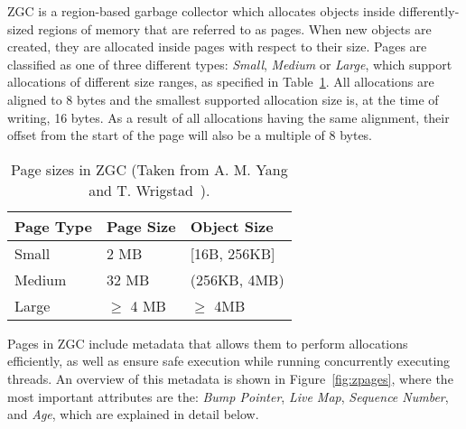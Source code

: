 
ZGC is a region-based garbage collector which allocates objects inside differently-sized regions of memory that are referred to as pages. When new objects are created, they are allocated inside pages with respect to their size. Pages are classified as one of three different types: \textit{Small}, \textit{Medium} or \textit{Large}, which support allocations of different size ranges, as specified in Table~\ref{table:zpage_sizes}. All allocations are aligned to 8 bytes and the smallest supported allocation size is, at the time of writing, 16 bytes. As a result of all allocations having the same alignment, their offset from the start of the page will also be a multiple of 8 bytes.

\begin{table}[H]
    \centering
    \begin{tabular}{lllll}
        Page Type   & Page Size     & \multicolumn{3}{l}{Object Size}      \\ \hline
        Small       & 2 MB          & \multicolumn{3}{l}{{[}16B, 256KB{]}} \\
        Medium      & 32 MB         & \multicolumn{3}{l}{(256KB, 4MB)}     \\
        Large       & $\geq$ 4 MB   & \multicolumn{3}{l}{$\geq$ 4MB}       \\
    \end{tabular}
    \caption{Page sizes in ZGC (Taken from A. M. Yang and T. Wrigstad~\cite{zgc:zpage_size_table}).}
    \label{table:zpage_sizes}
\end{table}

Pages in ZGC include metadata that allows them to perform allocations efficiently, as well as ensure safe execution while running concurrently executing threads. An overview of this metadata is shown in Figure~\ref{fig:zpages}, where the most important attributes are the: \textit{Bump Pointer}, \textit{Live Map}, \textit{Sequence Number}, and \textit{Age}, which are explained in detail below.

